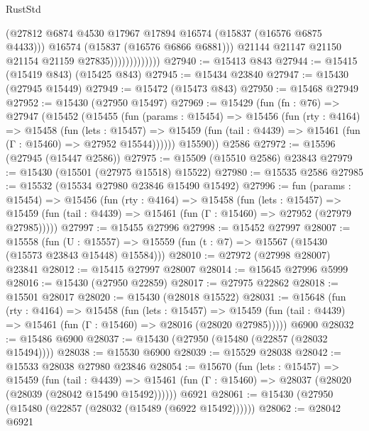 \begin{lexlean}{RustStd}
\begin{coremodule}
                                (@27812
                                  @6874
                                  @4530
                                  @17967
                                  @17894
                                  @16574
                                  (@15837 (@16576 @6875 @4433)))
                                @16574
                                (@15837 (@16576 @6866 @6881)))
                              @21144
                              @21147
                              @21150
                              @21154
                              @21159
                              @27835)))))))))))))
@27940 := @15413 @843
@27944 := @15415 (@15419 @843) (@15425 @843)
@27945 := @15434 @23840
@27947 := @15430 (@27945 @15449)
@27949 := @15472 (@15473 @843)
@27950 := @15468 @27949
@27952 := @15430 (@27950 @15497)
@27969 := @15429
    (fun (fn : @76) =>
    @27947
      (@15452
        (@15455
          (fun (params : @15454) =>
          @15456
            (fun (rty : @4164) =>
            @15458
              (fun (lets : @15457) =>
              @15459 (fun (tail : @4439) => @15461 (fun (Γ : @15460) => @27952 @15544))))))
        @15590))
    @2586
@27972 := @15596 (@27945 (@15447 @2586))
@27975 := @15509 (@15510 @2586) @23843
@27979 := @15430 (@15501 (@27975 @15518) @15522)
@27980 := @15535 @2586
@27985 := @15532 (@15534 @27980 @23846 @15490 @15492)
@27996 := fun (params : @15454) =>
  @15456
    (fun (rty : @4164) =>
    @15458
      (fun (lets : @15457) =>
      @15459 (fun (tail : @4439) => @15461 (fun (Γ : @15460) => @27952 (@27979 @27985)))))
@27997 := @15455 @27996
@27998 := @15452 @27997
@28007 := @15558
    (fun (U : @15557) => @15559 (fun (t : @7) => @15567 (@15430 (@15573 @23843 @15448) @15584)))
@28010 := @27972 (@27998 @28007) @23841
@28012 := @15415 @27997 @28007
@28014 := @15645 @27996 @5999
@28016 := @15430 (@27950 @22859)
@28017 := @27975 @22862
@28018 := @15501 @28017
@28020 := @15430 (@28018 @15522)
@28031 := @15648
    (fun (rty : @4164) =>
    @15458
      (fun (lets : @15457) =>
      @15459 (fun (tail : @4439) => @15461 (fun (Γ : @15460) => @28016 (@28020 @27985)))))
    @6900
@28032 := @15486 @6900
@28037 := @15430 (@27950 (@15480 (@22857 (@28032 @15494))))
@28038 := @15530 @6900
@28039 := @15529 @28038
@28042 := @15533 @28038 @27980 @23846
@28054 := @15670
    (fun (lets : @15457) =>
    @15459
      (fun (tail : @4439) =>
      @15461 (fun (Γ : @15460) => @28037 (@28020 (@28039 (@28042 @15490 @15492))))))
    @6921
@28061 := @15430 (@27950 (@15480 (@22857 (@28032 (@15489 (@6922 @15492))))))
@28062 := @28042 @6921

\end{coremodule}
\end{lexlean}
